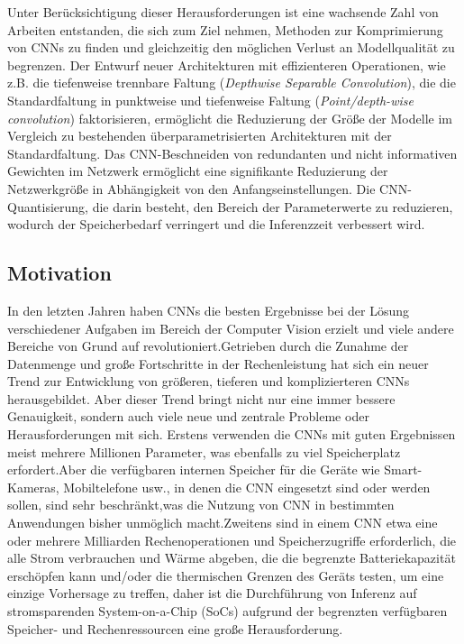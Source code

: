 \documentclass[12pt,a4paper]{scrartcl}
\numberwithin{equation}{section}
\begin{document}
Unter Berücksichtigung dieser Herausforderungen ist eine wachsende Zahl von Arbeiten entstanden, die sich zum Ziel nehmen, Methoden zur Komprimierung von \acsp{CNN} zu finden und gleichzeitig den möglichen Verlust an Modellqualität zu begrenzen.
Der Entwurf neuer Architekturen mit effizienteren Operationen, wie z.B. die tiefenweise trennbare Faltung (\textit{Depthwise Separable Convolution}), die die Standardfaltung in punktweise und tiefenweise Faltung (\textit{Point/depth-wise convolution}) faktorisieren, ermöglicht die Reduzierung der Größe der Modelle im Vergleich zu bestehenden überparametrisierten Architekturen mit der Standardfaltung.
Das CNN-Beschneiden von redundanten und nicht informativen Gewichten im Netzwerk ermöglicht eine signifikante Reduzierung der Netzwerkgröße in Abhängigkeit von den Anfangseinstellungen.
Die CNN-Quantisierung, die darin besteht, den Bereich der Parameterwerte zu reduzieren, wodurch der Speicherbedarf verringert und die Inferenzzeit verbessert wird.


\subsection{Motivation}
In den letzten Jahren haben \acsp{CNN} die besten Ergebnisse bei der Lösung verschiedener Aufgaben im Bereich der Computer Vision erzielt und viele andere Bereiche von Grund auf revolutioniert.Getrieben durch die Zunahme der Datenmenge und große Fortschritte in der Rechenleistung hat sich ein neuer Trend zur Entwicklung von größeren, tieferen und komplizierteren \acsp{CNN} herausgebildet. Aber dieser Trend bringt nicht nur eine immer bessere Genauigkeit, sondern auch viele neue und zentrale Probleme oder Herausforderungen mit sich.
Erstens verwenden die \acsp{CNN} mit guten Ergebnissen meist mehrere Millionen Parameter, was ebenfalls zu viel Speicherplatz erfordert.Aber die verfügbaren internen Speicher für die Geräte wie Smart-Kameras, Mobiltelefone usw., in denen die CNN eingesetzt sind oder werden sollen, sind sehr beschränkt,was die Nutzung von CNN in bestimmten Anwendungen bisher unmöglich macht.Zweitens sind in einem CNN  etwa eine oder mehrere Milliarden Rechenoperationen und Speicherzugriffe erforderlich, die alle Strom verbrauchen und Wärme abgeben, die die begrenzte Batteriekapazität erschöpfen kann und/oder die thermischen Grenzen des Geräts testen, um eine einzige Vorhersage zu treffen\cite{prunetoprune}, daher ist die Durchführung von Inferenz auf stromsparenden System-on-a-Chip (SoCs) aufgrund der begrenzten verfügbaren Speicher- und Rechenressourcen eine große Herausforderung.
\end{document}
